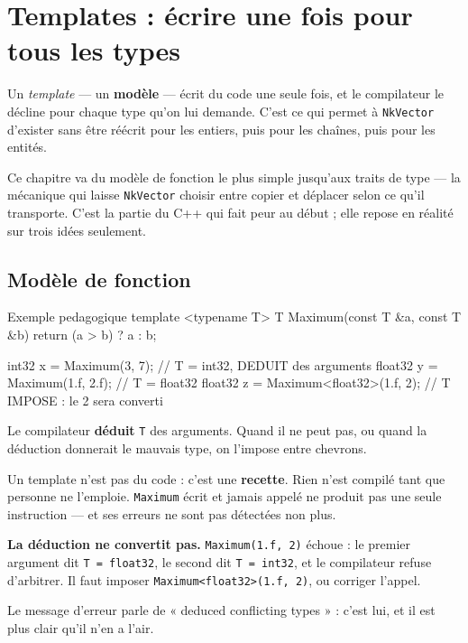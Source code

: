 \chapter{Templates : écrire une fois pour tous les types}

Un \emph{template} --- un \textbf{modèle} --- écrit du code une seule fois, et le
compilateur le décline pour chaque type qu'on lui demande. C'est ce qui permet à
\texttt{NkVector} d'exister sans être réécrit pour les entiers, puis pour les
chaînes, puis pour les entités.

Ce chapitre va du modèle de fonction le plus simple jusqu'aux traits de type ---
la mécanique qui laisse \texttt{NkVector} choisir entre copier et déplacer selon
ce qu'il transporte. C'est la partie du C++ qui fait peur au début ; elle repose
en réalité sur trois idées seulement.

\section{Modèle de fonction}

\begin{nkcode}{Exemple pedagogique}
template <typename T>
T Maximum(const T &a, const T &b) {
    return (a > b) ? a : b;
}

int32   x = Maximum(3, 7);        // T = int32, DEDUIT des arguments
float32 y = Maximum(1.f, 2.f);    // T = float32
float32 z = Maximum<float32>(1.f, 2);   // T IMPOSE : le 2 sera converti
\end{nkcode}

Le compilateur \textbf{déduit} \texttt{T} des arguments. Quand il ne peut pas, ou
quand la déduction donnerait le mauvais type, on l'impose entre chevrons.

\begin{nkretenir}
Un template n'est pas du code : c'est une \textbf{recette}. Rien n'est compilé
tant que personne ne l'emploie. \texttt{Maximum} écrit et jamais appelé ne
produit pas une seule instruction --- et ses erreurs ne sont pas détectées non
plus.
\end{nkretenir}

\begin{nkpiege}
\textbf{La déduction ne convertit pas.} \texttt{Maximum(1.f, 2)} échoue : le
premier argument dit \texttt{T = float32}, le second dit \texttt{T = int32}, et
le compilateur refuse d'arbitrer. Il faut imposer \texttt{Maximum<float32>(1.f,
2)}, ou corriger l'appel.

Le message d'erreur parle de « deduced conflicting types » : c'est lui, et il
est plus clair qu'il n'en a l'air.
\end{nkpiege}

